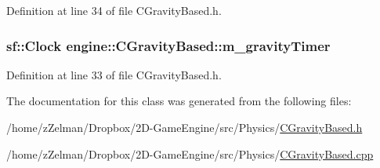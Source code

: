 Definition at line 34 of file C\-Gravity\-Based.\-h.

\hypertarget{classengine_1_1CGravityBased_a124ef300a1b855b6b508bdfede4fca39}{
\subsubsection[{m\-\_\-gravity\-Timer}]{\setlength{\rightskip}{0pt plus 5cm}sf\-::\-Clock engine\-::\-C\-Gravity\-Based\-::m\-\_\-gravity\-Timer\hspace{0.3cm}{\ttfamily [protected]}}}\label{classengine_1_1CGravityBased_a124ef300a1b855b6b508bdfede4fca39}


Definition at line 33 of file C\-Gravity\-Based.\-h.



The documentation for this class was generated from the following files\-:\begin{DoxyCompactItemize}
\item 
/home/z\-Zelman/\-Dropbox/2\-D-\/\-Game\-Engine/src/\-Physics/\hyperlink{CGravityBased_8h}{C\-Gravity\-Based.\-h}\item 
/home/z\-Zelman/\-Dropbox/2\-D-\/\-Game\-Engine/src/\-Physics/\hyperlink{CGravityBased_8cpp}{C\-Gravity\-Based.\-cpp}\end{DoxyCompactItemize}
